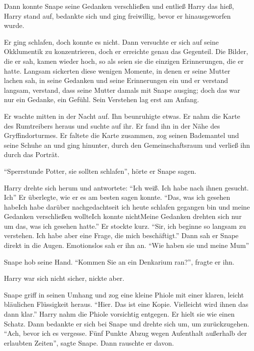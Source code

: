 Dann konnte Snape seine Gedanken verschließen und entließ Harry \gst das hieß, Harry stand auf, bedankte sich und ging freiwillig, bevor er hinausgeworfen wurde.

Er ging schlafen, doch konnte es nicht. Dann versuchte er sich auf seine Okklumentik zu konzentrieren, doch er erreichte genau das Gegenteil. Die Bilder, die er sah, kamen wieder hoch, so als seien sie die einzigen Erinnerungen, die er hatte. Langsam sickerten diese wenigen Momente, in denen er seine Mutter lachen sah, in seine Gedanken und seine Erinnerungen ein und er verstand langsam, verstand, dass seine Mutter damals mit Snape ausging; doch das war nur ein Gedanke, ein Gefühl. Sein Verstehen lag erst am Anfang.

Er wachte mitten in der Nacht auf. Ihn beunruhigte etwas. Er nahm die Karte des Rumtreibers heraus und suchte  auf ihr. Er fand ihn in der Nähe des Gryffindorturmes. Er faltete die Karte zusammen, zog seinen Bademantel und seine Schuhe an und ging hinunter, durch den Gemeinschaftsraum und verließ ihn durch das Porträt.

\enquote{Sperrstunde Potter, sie sollten schlafen}, hörte er Snape sagen.

Harry drehte sich herum und antwortete: \enquote{Ich weiß. Ich habe nach ihnen gesucht. Ich\abs} Er überlegte, wie er es am besten sagen konnte. \enquote{Das, was ich gesehen habe\abs Ich habe darüber nachgedacht\abs seit ich heute schlafen gegangen bin und meine Gedanken verschließen wollte\abs Ich konnte nicht\abs Meine Gedanken drehten sich nur um das, was ich gesehen hatte.} Er stockte kurz. \enquote{Sir, ich beginne so langsam zu verstehen. Ich habe aber eine Frage, die mich beschäftigt.} Dann sah er Snape direkt in die Augen. Emotionslos sah er ihn an. \enquote{Wie haben sie und meine Mum\abs}

Snape hob seine Hand. \enquote{Kommen Sie an ein Denkarium ran?}, fragte er ihn.

Harry war sich nicht sicher, nickte aber.

Snape griff in seinen Umhang und zog eine kleine Phiole mit einer klaren, leicht bläulichen Flüssigkeit heraus. \enquote{Hier. Das ist eine Kopie. Vielleicht wird ihnen das dann klar.} Harry nahm die Phiole vorsichtig entgegen. Er hielt sie wie einen Schatz. Dann bedankte er sich bei Snape und drehte sich um, um zurückzugehen. \enquote{Ach, bevor ich es vergesse. \gst Fünf Punkte Abzug wegen Aufenthalt außerhalb der erlaubten Zeiten}, sagte Snape. Dann rauschte er davon.

